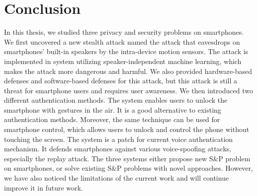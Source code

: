 \chapter{Conclusion}\label{chap:concl}
In this thesis, we studied three privacy and security problems on smartphones.
We first uncovered a new stealth attack named the {\attackName} attack that eavesdrops on smartphones' built-in speakers by the intra-device motion sensors. The attack is implemented in {\spp} system utilizing speaker-independent machine learning, which makes the attack more dangerous and harmful. We also provided hardware-based defenses and software-based defenses for this attack, but this attack is still a threat for smartphone users and requires user awareness. We then introduced two different authentication methods. The {\uu} system enables users to unlock the smartphone with gestures in the air.  It is a good alternative to existing authentication methods. Moreover, the same technique can be used for smartphone control, which allows users to unlock and control the phone without touching the screen.  The {\mv} system is a patch for current voice authentication mechanism. It defends smartphones against various voice-spoofing attacks, especially the replay attack. The three systems either propose new S\&P problem on smartphones, or solve existing S\&P problems with novel approaches. However, we have also noticed the limitations of the current work and will continue improve it in future work.


%

